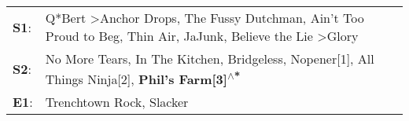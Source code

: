 \begin{supertabular}{p{0.03\textwidth}p{0.92\textwidth}}
 \textbf{S1}:  &  Q*Bert\textsuperscript{} \textgreater \enspace Anchor Drops\textsuperscript{}, \enspace The Fussy Dutchman\textsuperscript{}, \enspace Ain't Too Proud to Beg\textsuperscript{}, \enspace Thin Air\textsuperscript{}, \enspace JaJunk\textsuperscript{}, \enspace Believe the Lie\textsuperscript{} \textgreater \enspace Glory\textsuperscript{}  \enspace  \\
 \textbf{S2}:  &                                                                              No More Tears\textsuperscript{}, \enspace In The Kitchen\textsuperscript{}, \enspace Bridgeless\textsuperscript{}, \enspace Nopener[1]\textsuperscript{}, \enspace All Things Ninja[2]\textsuperscript{}, \enspace \textbf{Phil's Farm[3]\textsuperscript{$\wedge$*}}  \enspace  \\
 \textbf{E1}:  &                                                                                                                                                                                                                                                                              Trenchtown Rock\textsuperscript{}, \enspace Slacker\textsuperscript{}  \enspace  \\
\end{supertabular}
